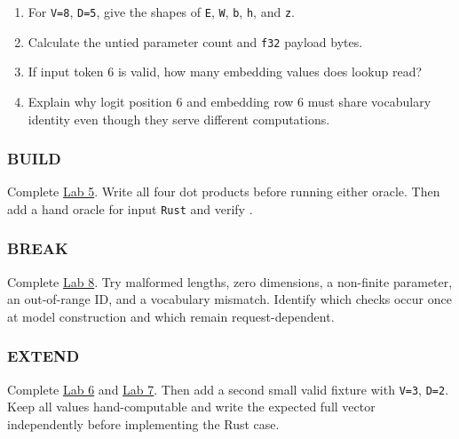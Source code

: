 \documentclass[
  10pt,
]{article}
\providecommand{\tightlist}{%
  \setlength{\itemsep}{0pt}\setlength{\parskip}{0pt}}
\begin{document}
\begin{enumerate}
\def\labelenumi{\arabic{enumi}.}
\tightlist
\item
  For \texttt{V=8}, \texttt{D=5}, give the shapes of \texttt{E},
  \texttt{W}, \texttt{b}, \texttt{h}, and \texttt{z}.
\item
  Calculate the untied parameter count and \texttt{f32} payload bytes.
\item
  If input token 6 is valid, how many embedding values does lookup read?
\item
  Explain why logit position 6 and embedding row 6 must share vocabulary
  identity even though they serve different computations.
\end{enumerate}

\subsubsection{BUILD}\label{build-2}

Complete
\href{https://github.com/hermonai/inside-the-llm-engine/blob/astra-visual-rewrite/labs/lab-05-forward-pass-by-hand.md}{Lab
5}. Write all four dot products before running either oracle. Then add a
hand oracle for input \texttt{Rust} and verify
\texttt{\seqsplit{[0.3,-0.2,-0.3,-0.5]}}.

\subsubsection{BREAK}\label{break-2}

Complete
\href{https://github.com/hermonai/inside-the-llm-engine/blob/astra-visual-rewrite/labs/lab-08-break-the-shape.md}{Lab
8}. Try malformed lengths, zero dimensions, a non-finite parameter, an
out-of-range ID, and a vocabulary mismatch. Identify which checks occur
once at model construction and which remain request-dependent.

\subsubsection{EXTEND}\label{extend-2}

Complete
\href{https://github.com/hermonai/inside-the-llm-engine/blob/astra-visual-rewrite/labs/lab-06-change-one-weight.md}{Lab
6} and
\href{https://github.com/hermonai/inside-the-llm-engine/blob/astra-visual-rewrite/labs/lab-07-same-last-token-same-output.md}{Lab
7}. Then add a second small valid fixture with \texttt{V=3},
\texttt{D=2}. Keep all values hand-computable and write the expected
full vector independently before implementing the Rust case.
\end{document}
